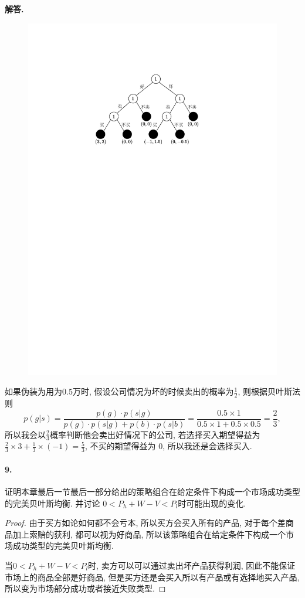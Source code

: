 \documentclass[12pt, a4paper, oneside]{ctexart}
\newenvironment{solution}{\par\noindent\textbf{解答. }}{\bigskip\par}
\begin{document}
\begin{solution}
\begin{figure}[htbp]
        \centering
        \includegraphics[scale=0.8]{5.7_1.pdf}
    \end{figure}

    如果伪装为用为$0.5$万时, 假设公司情况为坏的时候卖出的概率为$\frac{1}{2}$, 则根据贝叶斯法则
    \begin{equation*}
        p(g|s) = \frac{p(g)\cdot p(s|g)}{p(g)\cdot p(s|g)+p(b)\cdot p(s|b)} = \frac{0.5\times 1}{0.5\times 1+0.5\times 0.5} = \frac{2}{3},
    \end{equation*}
    所以我会以$\frac{2}{3}$概率判断他会卖出好情况下的公司, 若选择买入期望得益为$\frac{2}{3}\times 3 + \frac{1}{3}\times(-1) = \frac{5}{3}$, 不买的期望得益为 $0$, 所以我还是会选择买入.
\end{solution}
\paragraph{9.}证明本章最后一节最后一部分给出的策略组合在给定条件下构成一个市场成功类型的完美贝叶斯均衡. 并讨论 $0<P_h+W-V<P_l$时可能出现的变化.
\begin{proof}
    由于买方如论如何都不会亏本, 所以买方会买入所有的产品, 对于每个差商品加上索赔的获利, 都可以视为好商品, 所以该策略组合在给定条件下构成一个市场成功类型的完美贝叶斯均衡.

    当$0<P_h+W-V<P_l$时, 卖方可以可以通过卖出坏产品获得利润, 因此不能保证市场上的商品全部是好商品, 但是买方还是会买入所以有产品或有选择地买入产品, 所以变为市场部分成功或者接近失败类型.
\end{proof}
\end{document}
